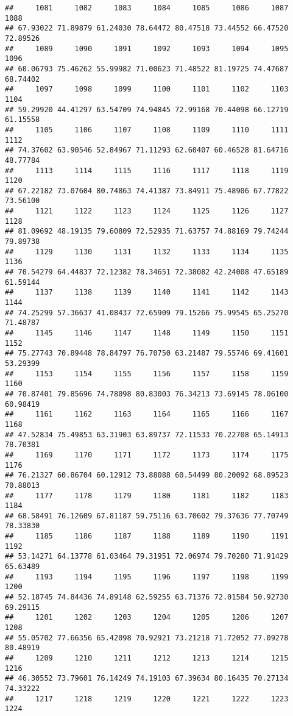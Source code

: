 \documentclass[
]{article}
\begin{document}
\begin{verbatim}
##     1081     1082     1083     1084     1085     1086     1087     1088 
## 67.93022 71.89879 61.24030 78.64472 80.47518 73.44552 66.47520 72.89526 
##     1089     1090     1091     1092     1093     1094     1095     1096 
## 60.06793 75.46262 55.99982 71.00623 71.48522 81.19725 74.47687 68.74402 
##     1097     1098     1099     1100     1101     1102     1103     1104 
## 59.29920 44.41297 63.54709 74.94845 72.99168 70.44098 66.12719 61.15558 
##     1105     1106     1107     1108     1109     1110     1111     1112 
## 74.37602 63.90546 52.84967 71.11293 62.60407 60.46528 81.64716 48.77784 
##     1113     1114     1115     1116     1117     1118     1119     1120 
## 67.22182 73.07604 80.74863 74.41387 73.84911 75.48906 67.77822 73.56100 
##     1121     1122     1123     1124     1125     1126     1127     1128 
## 81.09692 48.19135 79.60809 72.52935 71.63757 74.88169 79.74244 79.89738 
##     1129     1130     1131     1132     1133     1134     1135     1136 
## 70.54279 64.44837 72.12382 78.34651 72.38082 42.24008 47.65189 61.59144 
##     1137     1138     1139     1140     1141     1142     1143     1144 
## 74.25299 57.36637 41.08437 72.65909 79.15266 75.99545 65.25270 71.48787 
##     1145     1146     1147     1148     1149     1150     1151     1152 
## 75.27743 70.89448 78.84797 76.70750 63.21487 79.55746 69.41601 53.29399 
##     1153     1154     1155     1156     1157     1158     1159     1160 
## 70.87401 79.85696 74.78098 80.83003 76.34213 73.69145 78.06100 60.98419 
##     1161     1162     1163     1164     1165     1166     1167     1168 
## 47.52834 75.49853 63.31903 63.89737 72.11533 70.22708 65.14913 78.70381 
##     1169     1170     1171     1172     1173     1174     1175     1176 
## 76.21327 60.86704 60.12912 73.88088 60.54499 80.20092 68.89523 70.88013 
##     1177     1178     1179     1180     1181     1182     1183     1184 
## 68.58491 76.12609 67.81187 59.75116 63.70602 79.37636 77.70749 78.33830 
##     1185     1186     1187     1188     1189     1190     1191     1192 
## 53.14271 64.13778 61.03464 79.31951 72.06974 79.70280 71.91429 65.63489 
##     1193     1194     1195     1196     1197     1198     1199     1200 
## 52.18745 74.84436 74.89148 62.59255 63.71376 72.01584 50.92730 69.29115 
##     1201     1202     1203     1204     1205     1206     1207     1208 
## 55.05702 77.66356 65.42098 70.92921 73.21218 71.72052 77.09278 80.48919 
##     1209     1210     1211     1212     1213     1214     1215     1216 
## 46.30552 73.79601 76.14249 74.19103 67.39634 80.16435 70.27134 74.33222 
##     1217     1218     1219     1220     1221     1222     1223     1224 

\end{verbatim}
\end{document}
